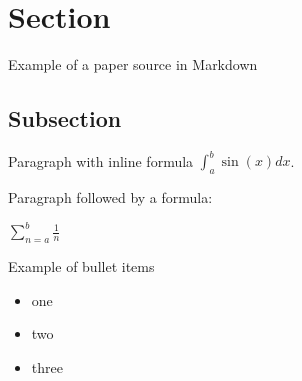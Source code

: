 \hypertarget{section}{%
\section{Section}\label{section}}

Example of a paper source in Markdown

\hypertarget{subsection}{%
\subsection{Subsection}\label{subsection}}

Paragraph with inline formula \(\int _a ^b \sin(x) dx\).

Paragraph followed by a formula:

\(\sum _{n=a} ^b \frac{1}{n}\)

Example of bullet items

\begin{itemize}
\tightlist
\item
  one
\item
  two
\item
  three
\end{itemize}
